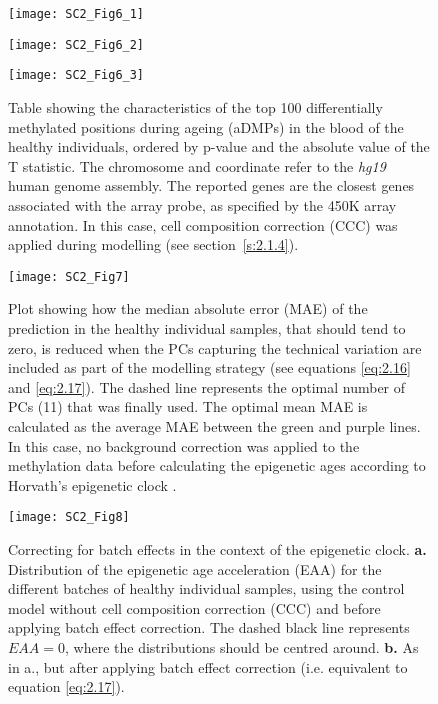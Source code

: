 \begin{figure}[htbp!]
	\centering    
	\texttt{[image: SC2\_Fig6\_1]}
\end{figure}
\begin{figure}[htbp!]
	\centering    
	\texttt{[image: SC2\_Fig6\_2]}
\end{figure}
\begin{figure}[htbp!]
	\centering    
	\texttt{[image: SC2\_Fig6\_3]}
	\caption[Table showing the top 100 aDMPs]{Table showing the characteristics of the top 100 differentially methylated positions during ageing (aDMPs) in the blood of the healthy individuals, ordered by p-value and the absolute value of the T statistic. The chromosome and coordinate refer to the \textit{hg19} human genome assembly. The reported genes are the closest genes associated with the array probe, as specified by the 450K array annotation. In this case, cell composition correction (CCC) was applied during modelling (see section~\ref{s:2.1.4}).}
	\label{fig:sc2_fig6}
\end{figure}	

\begin{figure}[htbp!] 
	\centering    
	\vspace*{3mm}
	\texttt{[image: SC2\_Fig7]}
	\caption[Impact of the absence of background correction on the predictions from the epigenetic clock]{Plot showing how the median absolute error (MAE) of the prediction in the healthy individual samples, that should tend to zero, is reduced when the PCs capturing the technical variation are included as part of the modelling strategy (see equations \ref{eq:2.16} and \ref{eq:2.17}). The dashed line represents the optimal number of PCs (11) that was finally used. The optimal mean MAE is calculated as the average MAE between the green and purple lines. In this case, no background correction was applied to the methylation data before calculating the epigenetic ages according to Horvath's epigenetic clock \citep{Horvath2013}.}
	\label{fig:sc2_fig7}
\end{figure}

\begin{figure}[htbp!] 
	\centering    
	\texttt{[image: SC2\_Fig8]}
	\caption[Correcting for batch effects: control model without cell composition correction]{Correcting for batch effects in the context of the epigenetic clock. \textbf{a.} Distribution of the epigenetic age acceleration (EAA) for the different batches of healthy individual samples, using the control model without cell composition correction (CCC) and before applying batch effect correction. The dashed black line represents $EAA = 0$, where the distributions should be centred around. \textbf{b.} As in a., but after applying batch effect correction (i.e. equivalent to equation \ref{eq:2.17}).}
	\label{fig:sc2_fig8}
\end{figure}

